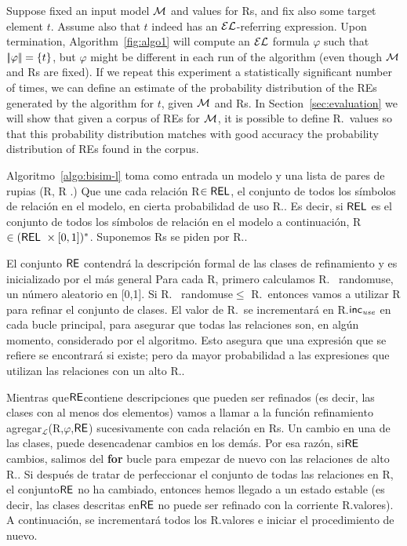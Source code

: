 Suppose fixed an input model $\mathcal{M}$ and values for Rs, and fix also some target element $t$.  Assume also that $t$ indeed has an $\mathcal{EL}$-referring expression.  Upon termination, Algorithm~\ref{fig:algo1} will compute an $\mathcal{EL}$ formula $\varphi$ such that $|\!|\varphi|\!| = \{t\}$, but $\varphi$ might be different in each run of the algorithm (even though $\mathcal{M}$ and Rs are fixed).  If we repeat this experiment a statistically significant number of times, we can define an estimate of the probability distribution of the REs generated by the algorithm for $t$, given $\mathcal{M}$ and Rs. In Section~\ref{sec:evaluation} we will show that given a corpus of REs for $\mathcal{M}$, it is possible to define R.\puse\ values so that this probability distribution matches with good accuracy the probability distribution of REs found in the corpus.  


Algoritmo~\ref{algo:bisim-l} toma como entrada un modelo y una lista de pares de rupias (R, R \puse.) Que une cada relaci\'on R$\in \textsf{REL} $, el conjunto de todos los s\'{i}mbolos de relaci\'on en el modelo, en cierta probabilidad de uso R.\puse.
Es decir, si $\textsf{REL}$ es el conjunto de todos los s\'{i}mbolos de relaci\'on en el modelo a continuaci\'on, R$\in (\textsf{REL} \ \times [0,1]) ^ * $. Suponemos Rs se piden por R.\puse.

El conjunto $\textsf{RE}$ contendr\'a la descripci\'on formal de las clases de refinamiento y es inicializado por el m\'as general 
Para cada R, primero calculamos R. \ randomuse, un n\'umero aleatorio en [0,1]. Si R. \ randomuse$\le$ R.\puse\ entonces vamos a utilizar R para refinar el conjunto de clases. El valor de R.\puse \ se incrementar\'a en R.$\textsf{inc}_\emph{use}$ en cada bucle principal, para asegurar que todas las relaciones son, en alg\'un momento, considerado por el algoritmo. Esto asegura que una expresi\'on que se refiere se encontrar\'a si existe; pero da mayor probabilidad a las expresiones que utilizan las relaciones con un alto R.\puse.

Mientras que$\textsf{RE}$contiene descripciones que pueden ser refinados (es decir, las clases con al menos dos elementos) vamos a llamar a la funci\'on refinamiento agregar$_\mathcal {L}$(R,$\varphi $,$\textsf{RE}$) sucesivamente con cada relaci\'on en Rs. Un cambio en una de las clases, puede desencadenar cambios en los dem\'as. Por esa raz\'on, si$\textsf{RE}$ cambios, salimos del \textbf {for} bucle para empezar de nuevo con las relaciones de alto R.\puse. Si despu\'es de tratar de perfeccionar el conjunto de todas las relaciones en R, el conjunto$\textsf{RE}$ no ha cambiado, entonces hemos llegado a un estado estable (es decir, las clases descritas en$\textsf{RE}$ no puede ser refinado con la corriente R.\puse valores). A continuaci\'on, se incrementar\'a todos los R.\puse valores e iniciar el procedimiento de nuevo.

